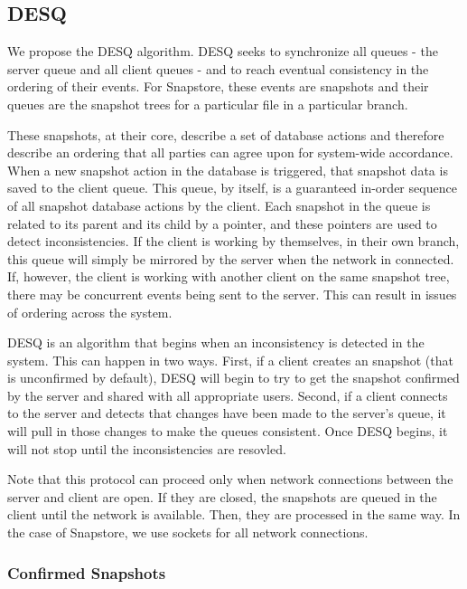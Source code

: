 \subsection{DESQ} 

We propose the DESQ algorithm. DESQ seeks to synchronize all queues - the server queue and all client queues - and to reach eventual consistency in the ordering of their events. For Snapstore, these events are snapshots and their queues are the snapshot trees for a particular file in a particular branch. 

These snapshots, at their core, describe a set of database actions and therefore describe an ordering that all parties can agree upon for system-wide accordance. When a new snapshot action in the database is triggered, that snapshot data is saved to the client queue. This queue, by itself, is a guaranteed in-order sequence of all snapshot database actions by the client. Each snapshot in the queue is related to its parent and its child by a pointer, and these pointers are used to detect inconsistencies. If the client is working by themselves, in their own branch, this queue will simply be mirrored by the server when the network in connected. If, however, the client is working with another client on the same snapshot tree, there may be concurrent events being sent to the server. This can result in issues of ordering across the system.

DESQ is an algorithm that begins when an inconsistency is detected in the system. This can happen in two ways. First, if a client creates an snapshot (that is unconfirmed by default), DESQ will begin to try to get the snapshot confirmed by the server and shared with all appropriate users. Second, if a client connects to the server and detects that changes have been made to the server's queue, it will pull in those changes to make the queues consistent. Once DESQ begins, it will not stop until the inconsistencies are resovled. 

Note that this protocol can proceed only when network connections between the server and client are open. If they are closed, the snapshots are queued in the client until the network is available. Then, they are processed in the same way. In the case of Snapstore, we use sockets for all network connections.

\subsubsection{Confirmed Snapshots}

